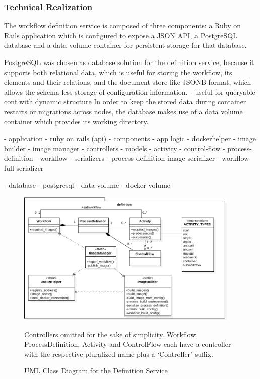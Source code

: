       \subsubsection{Technical Realization} %
      \label{ssub:technical_realization}
        The workflow definition service is composed of three components: a Ruby on Rails application which is configured to expose a JSON API, a PostgreSQL database and a data volume container for persistent storage for that database.

        PostgreSQL was chosen as database solution for the definition service, because it supports both relational data, which is useful for storing the workflow, its elements and their relations, and the document-store-like JSONB format, which allows the schema-less storage of configuration information.
        - useful for queryable conf with dynamic structure
        In order to keep the stored data during container restarts or migrations across nodes, the database makes use of a data volume container which provides its working directory.


      - application
        - ruby on rails (api)
        - components
          - app logic
            - dockerhelper
            - image builder
            - image manager
          - controllers
          - models
            - activity
            - control-flow
            - process-definition
            - workflow
          - serializers
            - process definition image serializer
            - workflow full serializer

      - database
        - postgresql
      - data volume
        - docker volume

    \begin{figure}[htbp]
      \centering

      \includegraphics[width=0.95\textwidth]{content/images/class_diagram_definition-crop.pdf}
      \caption*{\scriptsize Controllers omitted for the sake of simplicity. Workflow, ProcessDefinition, Activity and ControlFlow each have a controller with the respective pluralized name plus a `Controller' suffix.}
      \caption{UML Class Diagram for the Definition Service}
      \label{fig:label}
    \end{figure}


